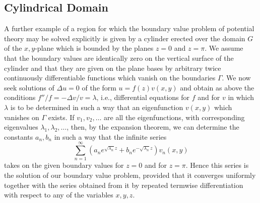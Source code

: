 \subsection{Cylindrical Domain}
A further example of a region for which the boundary value problem of potential theory may be solved explicitly is given by a cylinder erected over the domain $G$ of the $x,y$-plane which is bounded by the planes $z=0$ and $z=\pi$. We assume that the boundary values are identically zero on the vertical surface of the cylinder and that they are given on the plane bases by arbitrary twice continuously differentiable functions which vanish on the boundaries $\Gamma$. We now seek solutions of $\Delta u=0$ of the form $u=f(z)v(x,y)$ and obtain as above the conditions $f''/f=-\Delta v/v=\lambda$, i.e., differential equations for $f$ and for $v$ in which $\lambda$ is to be determined in such a way that an eigenfunction $v(x,y)$ which vanishes on $\Gamma$ exists. If $v_1,v_2,\ldots$ are all the eigenfunctions, with corresponding eigenvalues $\lambda_1,\lambda_2,\ldots$, then, by the expansion theorem, we can determine the constants $a_n,b_n$ in such a way that the infinite series
\[
\sum_{n=1}^{\infty}\left(a_ne^{\sqrt{\lambda_n}z}+b_ne^{-\sqrt{\lambda_n}z}\right)v_n(x,y)
\]
takes on the given boundary values for $z=0$ and for $z=\pi$. Hence this series is the solution of our boundary value problem, provided that it converges uniformly together with the series obtained from it by repeated termwise differentiation with respect to any of the variables $x,y,z$.

